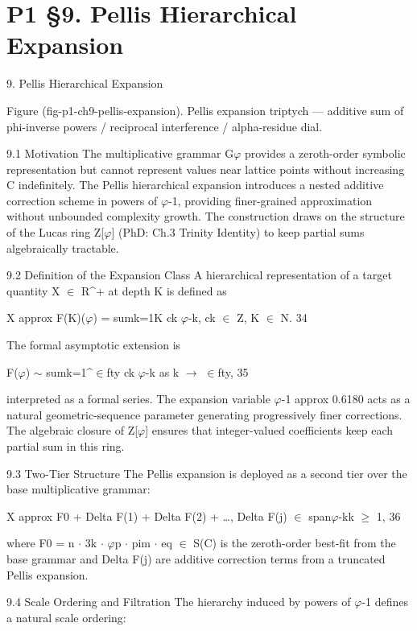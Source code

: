 
\section{P1 §9. Pellis Hierarchical Expansion}

9. Pellis Hierarchical Expansion

        Figure (fig-p1-ch9-pellis-expansion). Pellis expansion triptych --- additive sum of phi-inverse
                            powers / reciprocal interference / alpha-residue dial.

  9.1 Motivation
  The multiplicative grammar G$\varphi$ provides a zeroth-order symbolic representation but
  cannot represent values near lattice points without increasing C indefinitely. The Pellis
  hierarchical expansion introduces a nested additive correction scheme in powers of $\varphi$-1,
  providing finer-grained approximation without unbounded complexity growth. The
  construction draws on the structure of the Lucas ring Z[$\varphi$] (PhD: Ch.3 Trinity Identity)
  to keep partial sums algebraically tractable.

  9.2 Definition of the Expansion Class
  A hierarchical representation of a target quantity X $\in$ R^+ at depth K is defined as

  X approx F(K)($\varphi$) = sumk=1K ck $\varphi$-k, ck $\in$ Z, K $\in$ N. 34

  The formal asymptotic extension is

  F($\varphi$) $\sim$ sumk=1^$\in$fty ck $\varphi$-k as k $\rightarrow$ $\in$fty, 35

  interpreted as a formal series. The expansion variable $\varphi$-1 approx 0.6180 acts as a
  natural geometric-sequence parameter generating progressively finer corrections. The
  algebraic closure of Z[$\varphi$] ensures that integer-valued coefficients keep each partial sum
  in this ring.

  9.3 Two-Tier Structure
  The Pellis expansion is deployed as a second tier over the base multiplicative grammar:

  X approx F0 + Delta F(1) + Delta F(2) + …, Delta F(j) $\in$ span{$\varphi$-k}k $\geq$ 1, 36

  where F0 = n $\cdot$ 3k $\cdot$ $\varphi$p $\cdot$ pim $\cdot$ eq $\in$ S(C) is the zeroth-order best-fit from the base
  grammar and Delta F(j) are additive correction terms from a truncated Pellis expansion.

  9.4 Scale Ordering and Filtration
  The hierarchy induced by powers of $\varphi$-1 defines a natural scale ordering:


